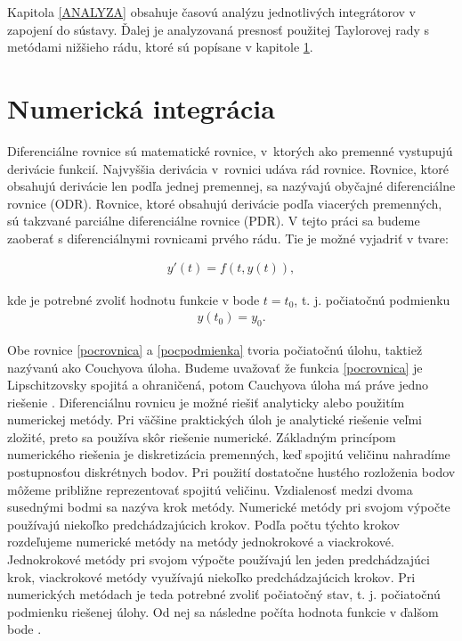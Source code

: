 Kapitola \ref{ANALYZA} obsahuje časovú analýzu jednotlivých integrátorov v zapojení do sústavy. Ďalej je analyzovaná presnosť použitej Taylorovej rady s metódami nižšieho rádu, ktoré sú popísane v kapitole \ref{NUM_INTEGRACIA}.









\chapter{Numerická integrácia} \label{NUM_INTEGRACIA}
Diferenciálne rovnice sú matematické rovnice, v~ktorých ako premenné vystupujú derivácie funkcií. Najvyššia derivácia v~rovnici udáva rád rovnice. Rovnice, ktoré obsahujú derivácie len podľa jednej premennej, sa nazývajú obyčajné diferenciálne rovnice (ODR). Rovnice, ktoré obsahujú derivácie podľa viacerých premenných, sú takzvané parciálne diferenciálne rovnice (PDR).
V tejto práci sa budeme zaoberať s diferenciálnymi rovnicami prvého rádu. Tie je možné vyjadriť v tvare: 

\begin{eqnarray}
y'(t) = f(t, y(t)) , \label{pocrovnica}
\end{eqnarray}

kde je potrebné zvoliť hodnotu funkcie v bode $ t = t_0 $, t. j. počiatočnú podmienku
\begin{eqnarray}
y(t_0) = y_0. \label{pocpodmienka}
\end{eqnarray}

Obe rovnice \eqref{pocrovnica} a \eqref{pocpodmienka} tvoria počiatočnú úlohu, taktiež nazývanú ako Couchyova úloha. Budeme uvažovať že funkcia \eqref{pocrovnica} je Lipschitzovsky spojitá a ohraničená, potom Cauchyova úloha má práve jedno riešenie \cite{SatekDisP}. 
Diferenciálnu rovnicu je možné riešiť analyticky alebo použitím numerickej metódy. Pri väčšine praktických úloh je analytické riešenie veľmi zložité, preto sa používa skôr riešenie numerické. Základným princípom numerického riešenia je diskretizácia premenných, keď spojitú veličinu nahradíme postupnosťou diskrétnych bodov. Pri použití dostatočne hustého rozloženia bodov môžeme približne reprezentovať spojitú veličinu. Vzdialenosť medzi dvoma susednými bodmi sa nazýva krok metódy. Numerické metódy pri svojom výpočte používajú niekoľko predchádzajúcich krokov. Podľa počtu týchto krokov rozdeľujeme numerické metódy na metódy jednokrokové a viackrokové. Jednokrokové metódy pri svojom výpočte používajú len jeden predchádzajúci krok, viackrokové metódy využívajú niekoľko predchádzajúcich krokov. Pri numerických metódach je teda potrebné zvoliť počiatočný stav, t. j. počiatočnú podmienku riešenej úlohy. Od nej sa následne počíta hodnota funkcie v ďalšom bode \cite{NumMetody}. 

